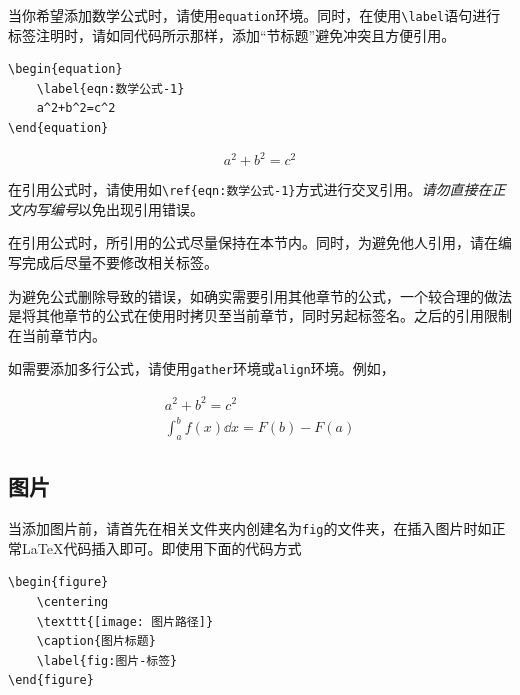 当你希望添加数学公式时，请使用\verb|equation|环境。同时，在使用\verb|\label|语句进行标签注明时，请如同代码所示那样，添加“节标题”避免冲突且方便引用。

\begin{lstlisting}[frame=line]
\begin{equation}
    \label{eqn:数学公式-1}
    a^2+b^2=c^2
\end{equation}
\end{lstlisting}

\begin{equation}
    \label{eqn:数学公式-1}
    a^2+b^2=c^2
\end{equation}

在引用公式时，请使用如\verb|\ref{eqn:数学公式-1}|方式进行交叉引用。\emph{请勿直接在正文内写编号}以免出现引用错误。

\begin{attention}
    在引用公式时，所引用的公式尽量保持在本节内。同时，为避免他人引用，请在编写完成后尽量不要修改相关标签。

    为避免公式删除导致的错误，如确实需要引用其他章节的公式，一个较合理的做法是将其他章节的公式在使用时拷贝至当前章节，同时另起标签名。之后的引用限制在当前章节内。
\end{attention}

如需要添加多行公式，请使用\verb|gather|环境或\verb|align|环境。例如，

\begin{gather}
    a^2+b^2=c^2\label{eqn:数学公式-2}\\
    \int_a^bf(x)\dd{x}=F(b)-F(a)\label{eqn:数学公式-3}
\end{gather}

\subsection{图片}\label{subsec:关于如何编写模板（教程）-图片}

当添加图片前，请首先在相关文件夹内创建名为\verb|fig|的文件夹，在插入图片时如正常\LaTeX 代码插入即可。即使用下面的代码方式

\begin{lstlisting}[frame=line]
\begin{figure}
    \centering
    \texttt{[image: 图片路径]}
    \caption{图片标题}
    \label{fig:图片-标签}
\end{figure}
\end{lstlisting}

